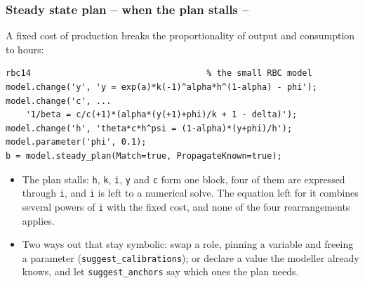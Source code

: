\documentclass[10pt,slidestop]{beamer}
\theoremstyle{plain}
\begin{document}
\begin{frame}[fragile]
  \frametitle{Steady state plan -- when the plan stalls --}

  A fixed cost of production breaks the proportionality of output and consumption
  to hours:

  \begin{lstlisting}[style=MatlabConsole,basicstyle=\ttfamily\scriptsize]
rbc14                                   % the small RBC model
model.change('y', 'y = exp(a)*k(-1)^alpha*h^(1-alpha) - phi');
model.change('c', ...
    '1/beta = c/c(+1)*(alpha*(y(+1)+phi)/k + 1 - delta)');
model.change('h', 'theta*c*h^psi = (1-alpha)*(y+phi)/h');
model.parameter('phi', 0.1);
b = model.steady_plan(Match=true, PropagateKnown=true);
  \end{lstlisting}

  \begin{itemize}\small
  \item The plan stalls: \verb+h+, \verb+k+, \verb+i+, \verb+y+ and \verb+c+ form
    one block, four of them are expressed through \verb+i+, and \verb+i+ is left to
    a numerical solve. The equation left for it combines several powers of \verb+i+
    with the fixed cost, and none of the four rearrangements applies.
  \item Two ways out that stay symbolic: swap a role, pinning a variable and
    freeing a parameter (\verb+suggest_calibrations+); or declare a value the
    modeller already knows, and let \verb+suggest_anchors+ say which ones the plan
    needs.
  \end{itemize}

\end{frame}
\end{document}
